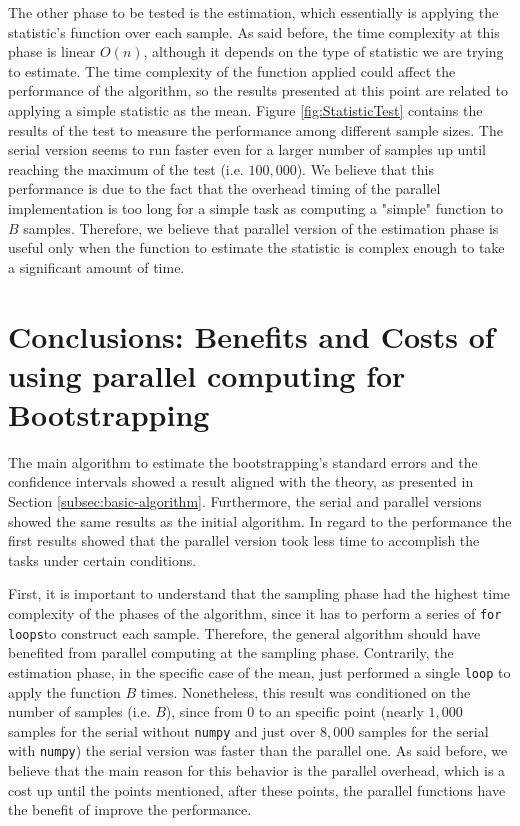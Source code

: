 \documentclass[11pt]{article}
\begin{document}
The other phase to be tested is the estimation, which essentially is applying the statistic's function over each sample.
As said before, the time complexity at this phase is linear $O(n)$, although it depends on the type of statistic we are
trying to estimate. The time complexity of the function applied could affect the performance of the algorithm, so the
results presented at this point are related to applying a simple statistic as the mean. Figure \ref{fig:StatisticTest}
contains the results of the test to measure the performance among different sample sizes. The serial version seems to
run faster even for a larger number of samples up until reaching the maximum of the test (i.e. $100,000$)\footnotemark. We
believe that this performance is due to the fact that the overhead timing of the parallel implementation is too long for
a simple task as computing a "simple" function to $B$ samples. Therefore, we believe that parallel version of the estimation
phase is useful only when the function to estimate the statistic is complex enough to take a significant amount of time.


\section{Conclusions: Benefits and Costs of using parallel computing for Bootstrapping}

The main algorithm to estimate the bootstrapping's standard errors and the confidence intervals showed a result aligned with
the theory, as presented in Section \ref{subsec:basic-algorithm}. Furthermore, the serial and parallel versions showed the same
results as the initial algorithm. In regard to the performance the first results showed that the parallel version took less
time to accomplish the tasks under certain conditions.

\medskip

First, it is important to understand that the sampling phase had the highest time complexity of the phases of the algorithm, since it has to
perform a series of \texttt{for loops}\footnotemark to construct each sample. Therefore, the general algorithm should have
benefited from parallel computing at the sampling phase. Contrarily, the estimation phase, in the specific case of the mean,
just performed a single \texttt{loop} to apply the function $B$ times. Nonetheless, this result was conditioned on the
number of samples (i.e. $B$), since from 0 to an specific point (nearly $1,000$ samples for the serial without \texttt{numpy}
and just over $8,000$ samples for the serial with \texttt{numpy}) the serial version was faster than the parallel one. As
said before, we believe that the main reason for this behavior is the parallel overhead, which is a cost up until the
points mentioned, after these points, the parallel functions have the benefit of improve the performance.
\end{document}
